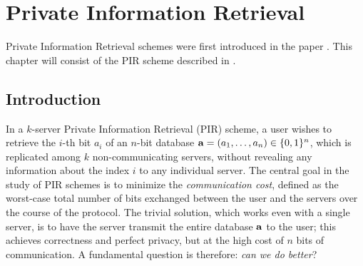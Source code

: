 \chapter{Private Information Retrieval}
\label{ch:pir}

Private Information Retrieval schemes were first introduced in the paper \cite{pir-sudan}. This chapter will consist of the PIR scheme described in \cite{improved-pir}.

\section{Introduction}

In a $k$-server Private Information Retrieval (PIR) scheme, a user wishes to retrieve the $i$-th bit $a_i$ of an $n$-bit database $\mathbf{a} = (a_1, \ldots, a_n) \in \{0,1\}^n$,
which is replicated among $k$ non-communicating servers, without revealing any
information about the index $i$ to any individual server.
The central goal in the study of PIR schemes is to minimize the \emph{communication cost}, defined as the worst-case total number of bits exchanged between the user and the servers over the course of the protocol.
The trivial solution, which works even with a single server, is to have the server transmit the entire database $\mathbf{a}$ to the user; this achieves correctness and perfect privacy, but at the high cost of $n$ bits of communication. A fundamental question is therefore: \emph{can we do better}?

